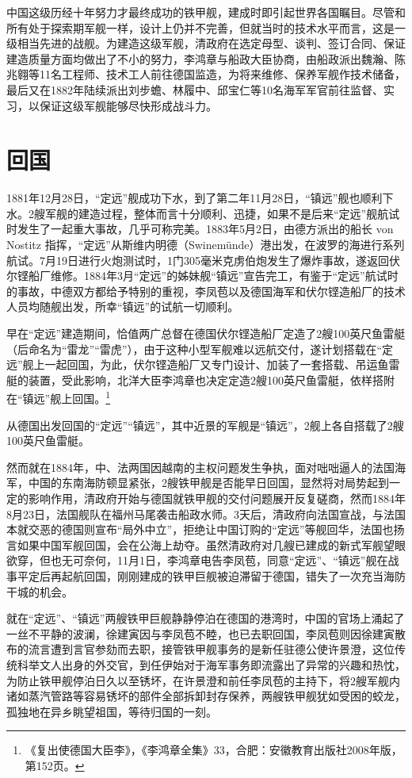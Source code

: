 \documentclass[12pt,UTF8]{ctexbook}
\begin{document}
中国这级历经十年努力才最终成功的铁甲舰，建成时即引起世界各国瞩目。尽管和所有处于探索期军舰一样，设计上仍并不完善，但就当时的技术水平而言，这是一级相当先进的战舰。为建造这级军舰，清政府在选定母型、谈判、签订合同、保证建造质量方面均做出了不小的努力，李鸿章与船政大臣协商，由船政派出魏瀚、陈兆翱等11名工程师、技术工人前往德国监造，为将来维修、保养军舰作技术储备，最后又在1882年陆续派出刘步蟾、林履中、邱宝仁等10名海军军官前往监督、实习，以保证这级军舰能够尽快形成战斗力。

\section{回国}

1881年12月28日，“定远”舰成功下水，到了第二年11月28日，“镇远”舰也顺利下水。2艘军舰的建造过程，整体而言十分顺利、迅捷，如果不是后来“定远”舰航试时发生了一起重大事故，几乎可称完美。1883年5月2日，由德方派出的船长 von Nostitz 指挥，“定远”从斯维内明德（Swinemünde）港出发，在波罗的海进行系列航试。7月19日进行火炮测试时，1门305毫米克虏伯炮发生了爆炸事故，遂返回伏尔铿船厂维修。1884年3月“定远”的姊妹舰“镇远”宣告完工，有鉴于“定远”航试时的事故，中德双方都给予特别的重视，李凤苞以及德国海军和伏尔铿造船厂的技术人员均随舰出发，所幸“镇远”的试航一切顺利。

早在“定远”建造期间，恰值两广总督在德国伏尔铿造船厂定造了2艘100英尺鱼雷艇（后命名为“雷龙”“雷虎”），由于这种小型军舰难以远航交付，遂计划搭载在“定远”舰上一起回国，为此，伏尔铿造船厂又专门设计、加装了一套搭载、吊运鱼雷艇的装置，受此影响，北洋大臣李鸿章也决定定造2艘100英尺鱼雷艇，依样搭附在“镇远”舰上回国。\footnote{《复出使德国大臣李》，《李鸿章全集》33，合肥：安徽教育出版社2008年版，第152页。}

从德国出发回国的“定远”“镇远”，其中近景的军舰是“镇远”，2舰上各自搭载了2艘100英尺鱼雷艇。

然而就在1884年，中、法两国因越南的主权问题发生争执，面对咄咄逼人的法国海军，中国的东南海防顿显紧张，2艘铁甲舰是否能早日回国，显然将对局势起到一定的影响作用，清政府开始与德国就铁甲舰的交付问题展开反复磋商，然而1884年8月23日，法国舰队在福州马尾袭击船政水师。3天后，清政府向法国宣战，与法国本就交恶的德国则宣布“局外中立”，拒绝让中国订购的“定远”等舰回华，法国也扬言如果中国军舰回国，会在公海上劫夺。虽然清政府对几艘已建成的新式军舰望眼欲穿，但也无可奈何，11月1日，李鸿章电告李凤苞，同意“定远”、“镇远”舰在战事平定后再起航回国，刚刚建成的铁甲巨舰被迫滞留于德国，错失了一次充当海防干城的机会。

就在“定远”、“镇远”两艘铁甲巨舰静静停泊在德国的港湾时，中国的官场上涌起了一丝不平静的波澜，徐建寅因与李凤苞不睦，也已去职回国，李凤苞则因徐建寅散布的流言遭到言官参劾而去职，接管铁甲舰事务的是新任驻德公使许景澄，这位传统科举文人出身的外交官，到任伊始对于海军事务即流露出了异常的兴趣和热忱，为防止铁甲舰停泊日久以至锈坏，在许景澄和前任李凤苞的主持下，将2艘军舰内诸如蒸汽管路等容易锈坏的部件全部拆卸封存保养，两艘铁甲舰犹如受困的蛟龙，孤独地在异乡眺望祖国，等待归国的一刻。
\end{document}
